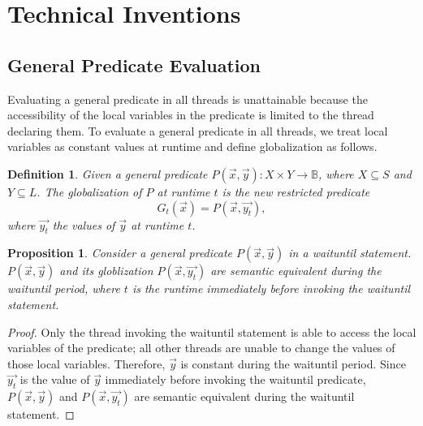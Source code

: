 \documentclass[preprint]{sigplanconf}
\newtheorem{definition}{Definition}
\newtheorem{proposition}{Proposition}
\begin{document}
\section{Technical Inventions} \label{sec:tech}


\subsection{General Predicate Evaluation}
Evaluating a general predicate in all threads is unattainable 
because the accessibility of the local variables in the predicate is limited 
to the thread declaring them. To evaluate a general predicate in all 
threads, we treat local variables as constant values at runtime and define 
globalization as follows. 
\begin{definition}
    Given a general predicate $P(\vec{x}, \vec{y}): X \times Y \rightarrow 
    \mathbb{B}$, where $X \subseteq S$ and $Y \subseteq L$. The globalization 
    of $P$ at runtime $t$ is the new restricted predicate
    \[
    G_t(\vec{x}) = P(\vec{x}, \vec{y_t}),
    \]
    where $\vec{y_t}$ the values of $\vec{y}$ at runtime $t$.
\end{definition}
\begin{proposition} \label{pro:glob}
    Consider a general predicate $P(\vec{x}, \vec{y})$ in a waituntil 
    statement. $P(\vec{x}, \vec{y})$ and its globlization 
    $P(\vec{x}, \vec{y_t})$ are semantic equivalent during the waituntil 
    period, where $t$ is the runtime immediately before invoking the 
    waituntil statement.  
\end{proposition}
\begin{proof}
    Only the thread invoking the waituntil statement is able to access the
    local variables of the predicate; all other threads are unable to change
    the values of those local variables. Therefore, $\vec{y}$ is constant 
    during the waituntil period. Since $\vec{y_t}$ is the value of $\vec{y}$
    immediately before invoking the waituntil predicate, $P(\vec{x}, \vec{y})$
    and $P(\vec{x}, \vec{y_t})$ are semantic equivalent during the waituntil
    statement. 
\end{proof}
\end{document}
